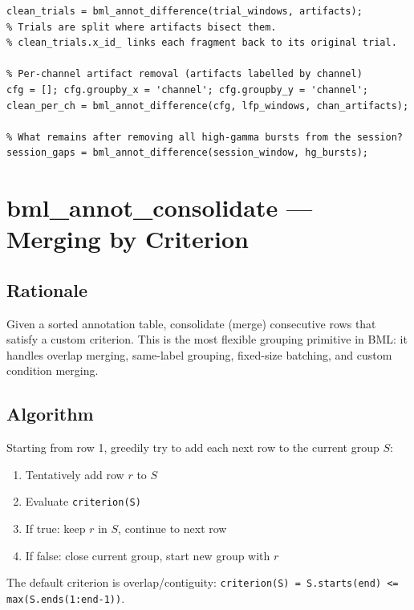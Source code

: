 \documentclass[11pt, a4paper]{article}
\begin{document}
\begin{lstlisting}[style=matlab]
% Remove artifact periods from trial windows
clean_trials = bml_annot_difference(trial_windows, artifacts);
% Trials are split where artifacts bisect them.
% clean_trials.x_id_ links each fragment back to its original trial.

% Per-channel artifact removal (artifacts labelled by channel)
cfg = []; cfg.groupby_x = 'channel'; cfg.groupby_y = 'channel';
clean_per_ch = bml_annot_difference(cfg, lfp_windows, chan_artifacts);

% What remains after removing all high-gamma bursts from the session?
session_gaps = bml_annot_difference(session_window, hg_bursts);
\end{lstlisting}

\section{bml\_annot\_consolidate --- Merging by Criterion}
\label{sec:consolidate}

\subsection{Rationale}

Given a sorted annotation table, consolidate (merge) consecutive rows that satisfy a custom criterion. This is the most flexible grouping primitive in BML: it handles overlap merging, same-label grouping, fixed-size batching, and custom condition merging.

\subsection{Algorithm}

Starting from row 1, greedily try to add each next row to the current group $S$:
\begin{enumerate}[noitemsep]
  \item Tentatively add row $r$ to $S$
  \item Evaluate \texttt{criterion(S)}
  \item If true: keep $r$ in $S$, continue to next row
  \item If false: close current group, start new group with $r$
\end{enumerate}

The default criterion is overlap/contiguity: \texttt{criterion(S) = S.starts(end) <= max(S.ends(1:end-1))}.
\end{document}
